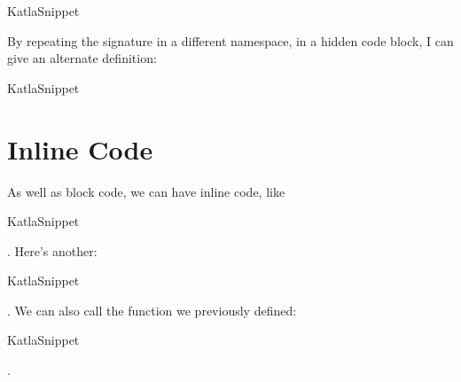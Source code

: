 \let\KatlaSnippet\relax{}\newcommand\KatlaSnippet[1][]{\UseVerbatim[#1]{KatlaSnippet}}
\begin{SaveVerbatim}[commandchars=\\\{\}]{KatlaSnippet}
\KatlaSpace{}\KatlaSpace{}\IdrisKeyword{=}\KatlaSpace{}\KatlaSpace{}\IdrisFunction{++}\KatlaSpace{}\KatlaNewline{}
\end{SaveVerbatim}
\KatlaSnippet{}

By repeating the signature in a different namespace, in a hidden code
block, I can give an alternate definition:

\let\KatlaSnippet\relax{}\newcommand\KatlaSnippet[1][]{\UseVerbatim[#1]{KatlaSnippet}}
\begin{SaveVerbatim}[commandchars=\\\{\}]{KatlaSnippet}
\KatlaSpace{}\KatlaSpace{}\IdrisKeyword{=}\KatlaSpace{}\KatlaSpace{}\IdrisFunction{++}\KatlaSpace{}\KatlaSpace{}\KatlaNewline{}
\end{SaveVerbatim}
\KatlaSnippet{}

\hypertarget{inline-code}{%
\section{Inline Code}\label{inline-code}}

As well as block code, we can have inline code, like
\let\KatlaSnippet\relax{}\newcommand\KatlaSnippet[1][]{\UseVerb[#1]{KatlaSnippet}}
\begin{SaveVerbatim}[commandchars=\\\{\}]{KatlaSnippet}
\KatlaSpace{}\KatlaSpace{}\KatlaNewline{}
\end{SaveVerbatim}
\KatlaSnippet{}. Here's another:
\let\KatlaSnippet\relax{}\newcommand\KatlaSnippet[1][]{\UseVerb[#1]{KatlaSnippet}}
\begin{SaveVerbatim}[commandchars=\\\{\}]{KatlaSnippet}
\KatlaSpace{}\IdrisFunction{+}\KatlaSpace{}\KatlaNewline{}
\end{SaveVerbatim}
\KatlaSnippet{}. We can also call the function we previously defined:
\let\KatlaSnippet\relax{}\newcommand\KatlaSnippet[1][]{\UseVerb[#1]{KatlaSnippet}}
\begin{SaveVerbatim}[commandchars=\\\{\}]{KatlaSnippet}
\KatlaSpace{}\IdrisData{[1,}\KatlaSpace{}\KatlaSpace{}\IdrisData{3]}\KatlaNewline{}
\end{SaveVerbatim}
\KatlaSnippet{}.

